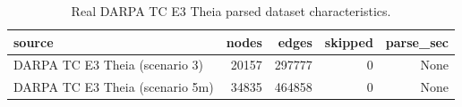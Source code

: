\begin{table}[htbp]
\centering
\caption{Real DARPA TC E3 Theia parsed dataset characteristics.}
\label{tab:datasets}
\begin{tabular}{lrrrr}
\hline
source & nodes & edges & skipped & parse_sec \\
\hline
DARPA TC E3 Theia (scenario 3) & 20157 & 297777 & 0 & None \\
DARPA TC E3 Theia (scenario 5m) & 34835 & 464858 & 0 & None \\
\hline
\end{tabular}
\end{table}
